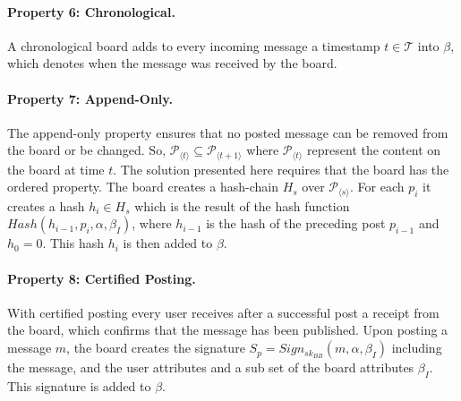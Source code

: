 \documentclass[bibtotoc,halfparskip,oneside]{scrreprt}
\begin{document}
	\paragraph*{Property 6: Chronological.}
	
	A chronological board adds to every incoming message a timestamp $t\in\mathcal{T}$ into $\beta$, which denotes when the message was received by the board.
	
	\paragraph*{Property 7: Append-Only.}
	
	The append-only property ensures that no posted message can be removed from the board or be changed. So, $\mathcal{P}_{\langle t\rangle} \subseteq \mathcal{P}_{{\langle t+1\rangle}}$ where $\mathcal{P}_{{\langle t\rangle}} $ represent the content on the board at time $t$. The solution presented here requires that the board has the ordered property. The board creates a hash-chain $H_s$ over $\mathcal{P}_{\langle s\rangle}$. For each $p_i$ it creates a hash $h_i\in{H_s}$ which is the result of the hash function $\mathit{Hash}(h_{i-1}, p_i, \alpha, \beta_{I})$, where $h_{i-1}$ is the hash of the preceding post $p_{i-1}$ and $h_0=0$.
	This hash $h_i$ is then added to $\beta$.
	
	\paragraph*{Property 8: Certified Posting.}
	
	With certified posting every user receives after a successful post a receipt from the board, which confirms that the message has been published.
	Upon posting a message $m$, the board creates the signature $S_p= Sign_{sk_{BB}}(m, \alpha,\beta_I)$ including the message, and the user attributes and a sub set of the board attributes $\beta_I$. This signature is added to $\beta$.
	
\end{document}

